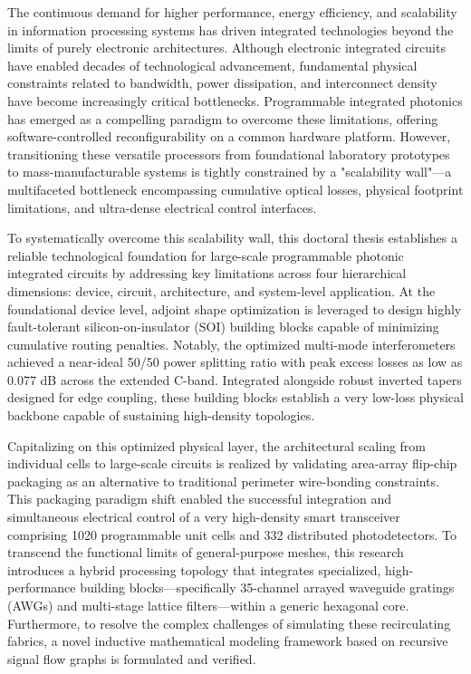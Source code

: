 %

The continuous demand for higher performance, energy efficiency, and scalability in information 
processing systems has driven integrated technologies beyond the limits of purely electronic 
architectures. Although electronic integrated circuits have enabled decades of technological 
advancement, fundamental physical constraints related to bandwidth, power dissipation, and 
interconnect density have become increasingly critical bottlenecks. Programmable integrated 
photonics has emerged as a compelling paradigm to overcome these limitations, offering 
software-controlled reconfigurability on a common hardware platform. However, transitioning these 
versatile processors from foundational laboratory prototypes to mass-manufacturable systems is 
tightly constrained by a "scalability wall"—a multifaceted bottleneck encompassing cumulative 
optical losses, physical footprint limitations, and ultra-dense electrical control interfaces.

To systematically overcome this scalability wall, this doctoral thesis establishes a reliable 
technological foundation for large-scale programmable photonic integrated circuits by addressing 
key limitations across four hierarchical dimensions: device, circuit, architecture, and 
system-level application. At the foundational device level, adjoint shape optimization is leveraged 
to design highly fault-tolerant silicon-on-insulator (SOI) building blocks capable of minimizing 
cumulative routing penalties. Notably, the optimized multi-mode interferometers achieved a 
near-ideal 50/50 power splitting ratio with peak excess losses as low as 0.077 dB across the 
extended C-band. Integrated alongside robust inverted tapers designed for edge coupling, these 
building blocks establish a very low-loss physical backbone capable of sustaining high-density 
topologies.

Capitalizing on this optimized physical layer, the architectural scaling from individual cells to 
large-scale circuits is realized by validating area-array flip-chip packaging as an alternative to 
traditional perimeter wire-bonding constraints. This packaging paradigm shift enabled the 
successful integration and simultaneous electrical control of a very high-density smart transceiver 
comprising 1020 programmable unit cells and 332 distributed photodetectors. To transcend the 
functional limits of general-purpose meshes, this research introduces a hybrid processing topology 
that integrates specialized, high-performance building blocks—specifically 35-channel arrayed 
waveguide gratings (AWGs) and multi-stage lattice filters—within a generic hexagonal core. 
Furthermore, to resolve the complex challenges of simulating these recirculating fabrics, a novel 
inductive mathematical modeling framework based on recursive signal flow graphs is formulated and 
verified.

